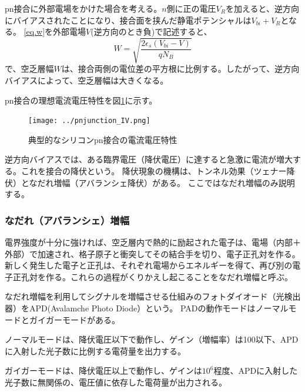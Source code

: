 pn接合に外部電場をかけた場合を考える。$n$側に正の電圧$V_R$を加えると、逆方向にバイアスされたことになり、接合面を挟んだ静電ポテンシャルは$V_{bi}+V_R$となる。
\eqref{eq.w}を外部電場$V$(逆方向のとき負)で記述すると、
\begin{equation}
W=\sqrt{\frac{2\epsilon_s(V_{bi}-V)}{qN_B}}
\end{equation}
で、空乏層幅$W$は、接合両側の電位差の平方根に比例する。したがって、逆方向バイアスによって、空乏層幅は大きくなる。

pn接合の理想電流電圧特性を図\ref{fig.pnIV}に示す。
\begin{figure}[H]
  \begin{center}
    \texttt{[image: ../pnjunction\_IV.png]}
  \end{center}
  \caption{典型的なシリコンpn接合の電流電圧特性}\label{fig.pnIV}
\end{figure}
逆方向バイアスでは、ある臨界電圧（降伏電圧）に達すると急激に電流が増大する。これを接合の降伏という。
降伏現象の機構は、トンネル効果（ツェナー降伏）となだれ増幅（アバランシェ降伏）がある。
ここではなだれ増幅のみ説明する。

\subsubsection{なだれ（アバランシェ）増幅}

電界強度が十分に強ければ、空乏層内で熱的に励起された電子は、電場（内部＋外部）で加速され、格子原子と衝突してその結合手を切り、電子正孔対を作る。
新しく発生した電子と正孔は、それぞれ電場からエネルギーを得て、再び別の電子正孔対を作る。これらの過程がくりかえし起こることをなだれ増幅と呼ぶ。

なだれ増幅を利用してシグナルを増幅させる仕組みのフォトダイオード（光検出器）をAPD(Avalamche Photo Diode）という。
PADの動作モードはノーマルモードとガイガーモードがある。

ノーマルモードは、降伏電圧以下で動作し、ゲイン（増幅率）は100以下、APDに入射した光子数に比例する電荷量を出力する。

ガイガーモードは、降伏電圧以上で動作し、ゲインは$10^6$程度、APDに入射した光子数に無関係の、電圧値に依存した電荷量が出力される。


